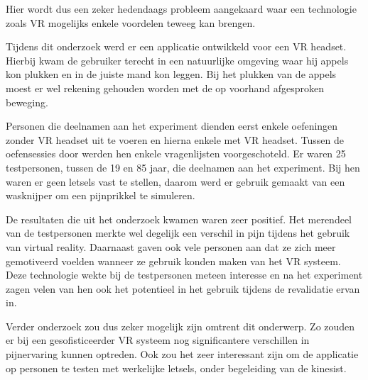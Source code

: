 Hier wordt dus een zeker hedendaags probleem aangekaard waar een technologie zoals VR mogelijks enkele voordelen teweeg kan brengen.

Tijdens dit onderzoek werd er een applicatie ontwikkeld voor een VR headset. Hierbij kwam de gebruiker terecht in een natuurlijke omgeving waar hij appels kon plukken en in de juiste mand kon leggen. Bij het plukken van de appels moest er wel rekening gehouden worden met de op voorhand afgesproken beweging.

Personen die deelnamen aan het experiment dienden eerst enkele oefeningen zonder VR headset uit te voeren en hierna enkele met VR headset. Tussen de oefensessies door werden hen enkele vragenlijsten voorgeschoteld. Er waren 25 testpersonen, tussen de 19 en 85 jaar, die deelnamen aan het experiment. Bij hen waren er geen letsels vast te stellen, daarom werd er gebruik gemaakt van een wasknijper om een pijnprikkel te simuleren.

De resultaten die uit het onderzoek kwamen waren zeer positief. Het merendeel van de testpersonen merkte wel degelijk een verschil in pijn tijdens het gebruik van virtual reality. Daarnaast gaven ook vele personen aan dat ze zich meer gemotiveerd voelden wanneer ze gebruik konden maken van het VR systeem. Deze technologie wekte bij de testpersonen meteen interesse en na het experiment zagen velen van hen ook het potentieel in het gebruik tijdens de revalidatie ervan in.

Verder onderzoek zou dus zeker mogelijk zijn omtrent dit onderwerp. Zo zouden er bij een gesofisticeerder VR systeem nog significantere verschillen in pijnervaring kunnen optreden. Ook zou het zeer interessant zijn om de applicatie op personen te testen met werkelijke letsels, onder begeleiding van de kinesist.
